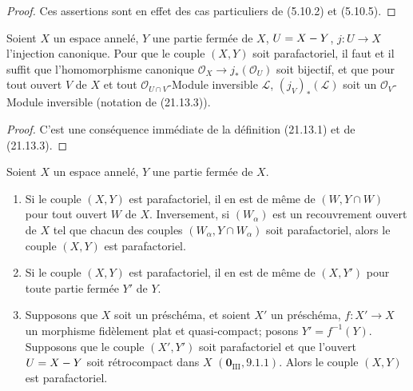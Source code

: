 \begin{proof}
Ces assertions sont en effet des cas particuliers de (5.10.2) et (5.10.5).
\end{proof}

\begin{proposition}[21.13.5]
\label{IV.21.13.5}
Soient $X$ un espace annelé, $Y$ une partie fermée de $X$, $U=X- Y$,
$j:U\to X$ l'injection canonique. Pour que le couple $(X,Y)$ soit parafactoriel, il
faut et il suffit que l'homomorphisme canonique $\mathcal O_X\to j_*(\mathcal O_U)$
soit bijectif, et que pour tout ouvert $V$ de $X$ et tout
$\mathcal O_{U\cap V}$-Module inversible $\mathscr L$, $(j_V)_*(\mathscr L)$ soit un
$\mathcal O_V$-Module inversible (notation de \textup{(21.13.3))}.
\end{proposition}

\begin{proof}
C'est une conséquence immédiate de la définition (21.13.1) et de (21.13.3).
\end{proof}

\begin{corollary}[21.13.6]
\label{IV.21.13.6}
Soient $X$ un espace annelé, $Y$ une partie fermée de $X$.
\begin{enumerate}[label=\textup{(\roman*)}]
  \item Si le couple $(X,Y)$ est parafactoriel, il en est de même de
  $(W,Y\cap W)$ pour tout ouvert $W$ de $X$. Inversement, si $(W_\alpha)$ est un
  recouvrement ouvert de $X$ tel que chacun des couples
  $(W_\alpha,Y\cap W_\alpha)$ soit parafactoriel, alors le couple $(X,Y)$ est
  parafactoriel.
  \item Si le couple $(X,Y)$ est parafactoriel, il en est de même de $(X,Y')$ pour
  toute partie fermée $Y'$ de $Y$.
  \item Supposons que $X$ soit un préschéma, et soient $X'$ un préschéma,
  $f:X'\to X$ un morphisme fidèlement plat et quasi-compact; posons
  $Y'=f^{-1}(Y)$. Supposons que le couple $(X',Y')$ soit parafactoriel et que
  l'ouvert $U=X- Y$ soit rétrocompact dans $X$ $(\mathbf 0_{\mathrm{III}}, 9.1.1)$.
  Alors le couple $(X,Y)$ est parafactoriel.
\end{enumerate}
\end{corollary}

